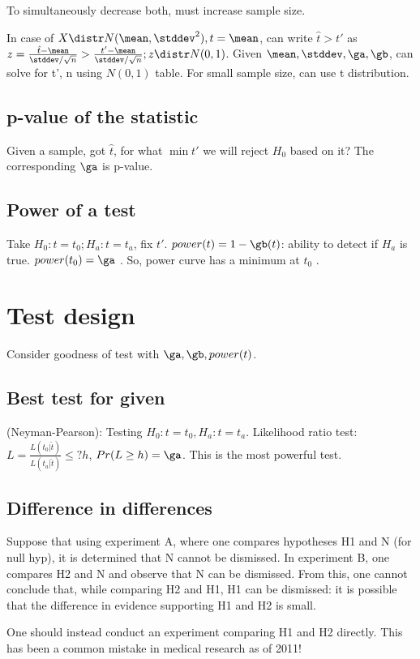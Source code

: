 \documentclass[oneside, article]{memoir}
\begin{document}
To simultaneously decrease both, must increase sample size.

In case of $X \distr N(\mean, \stddev^{2}), t=\mean$, can write $\hat{t} > t'$ as $z = \frac{\hat{t} - \mean}{\stddev/\sqrt{n}} > \frac{t' - \mean}{\stddev/\sqrt{n}}; z \distr N(0, 1)$. Given $ \mean, \stddev, \ga, \gb$, can solve for t', n using $N(0, 1)$ table. For small sample size, can use t distribution.

\subsection{p-value of the statistic}
Given a sample, got $\hat{t}$, for what $\min t'$ we will reject $H_{0}$ based on it? The corresponding $\ga$ is p-value.

\subsection{Power of a test}
Take $H_{0}: t = t_{0}; H_{a}: t = t_{a}$, fix $t'$. $power(t) = 1 - \gb(t)$: ability to detect if $H_{a}$ is true. $power(t_{0}) = \ga$ \chk. So, power curve has a minimum at $t_{0}$ \chk.

\section{Test design}
Consider goodness of test with $\ga, \gb, power(t)$.

\subsection{Best test for given }
(Neyman-Pearson): Testing $H_{0}: t = t_{0}, H_{a}: t = t_{a}$. Likelihood ratio test: $L = \frac{L(t_{0}|\hat{t})}{L(t_{a}|\hat{t})} \leq? h$, $Pr(L \geq h) = \ga$. This is the most powerful test.

\subsection{Difference in differences}
Suppose that using experiment A, where one compares hypotheses H1 and N (for null hyp), it is determined that N cannot be dismissed. In experiment B, one compares H2 and N and observe that N can be dismissed. From this, one cannot conclude that, while comparing H2 and H1, H1 can be dismissed: it is possible that the difference in evidence supporting H1 and H2 is small.

One should instead conduct an experiment comparing H1 and H2 directly. This has been a common mistake in medical research as of 2011!
\end{document}
